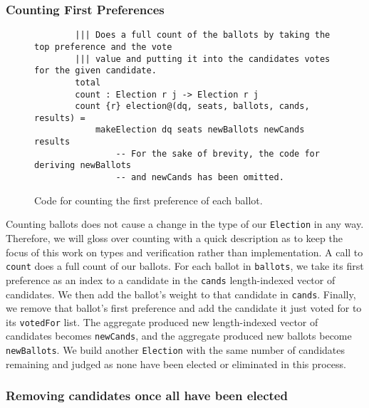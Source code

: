 \subsubsection{Counting First Preferences}

\begin{figure}[ht!!!!!!!!]
	\caption{Code for counting the first preference of each ballot.}
	\label{counting_code}
    \begin{lstlisting}
        ||| Does a full count of the ballots by taking the top preference and the vote
        ||| value and putting it into the candidates votes for the given candidate. 
        total
        count : Election r j -> Election r j
        count {r} election@(dq, seats, ballots, cands, results) = 
            makeElection dq seats newBallots newCands results
                -- For the sake of brevity, the code for deriving newBallots 
                -- and newCands has been omitted. 
    \end{lstlisting}
\end{figure}

Counting ballots does not cause a change in the type of our \texttt{Election} in
any way. Therefore, we will gloss over counting with a quick description as to
keep the focus of this work on types and verification rather than
implementation. A call to \texttt{count} does a full count of our ballots. For
each ballot in \texttt{ballots}, we take its first preference as an index to a
candidate in the \texttt{cands} length-indexed vector of candidates. We then add
the ballot's weight to that candidate in \texttt{cands}. Finally, we remove that
ballot's first preference and add the candidate it just voted for to its
\texttt{votedFor} list. The aggregate produced new length-indexed vector of
candidates becomes \texttt{newCands}, and the aggregate produced new ballots
become \texttt{newBallots}. We build another \texttt{Election} with the same
number of candidates remaining and judged as none have been elected or
eliminated in this process. 

\subsubsection{Removing candidates once all have been elected}


